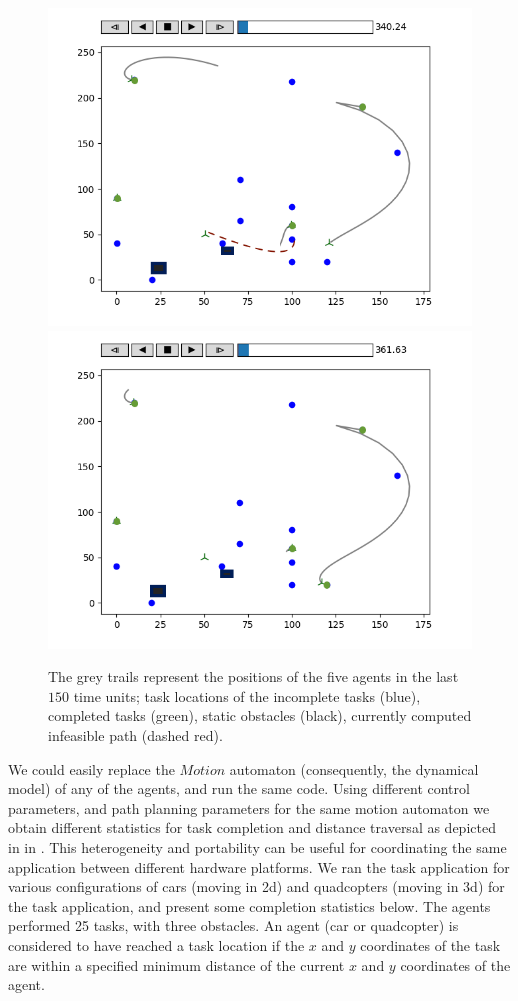 \begin{figure}[h!]
\begin{minipage}{0.5\textwidth}
\includegraphics[width=.5\textwidth]{figs/task2.png}\hfill
\includegraphics[width=.5\textwidth]{figs/task1.png}\hfill%
\end{minipage}%
\caption{\small The grey trails represent the positions of the five agents in the last $150$ time units; task locations of the incomplete tasks (blue), completed tasks (green), static obstacles (black), currently computed infeasible path (dashed red).}
\label{fig:taskplots}
\end{figure}

We could  easily replace the $\mathit{Motion}$ automaton (consequently, the dynamical model) of any of the agents, and run the same code. Using different control parameters, and path planning parameters for the same motion automaton we obtain different statistics for task completion and distance traversal as depicted in in . This heterogeneity and portability can be useful for coordinating the same application between different hardware platforms. We ran the task application for various configurations of cars (moving in 2d) and quadcopters (moving in 3d) for the task application, and present some completion statistics below. The agents performed 25 tasks, with three obstacles. An agent (car or quadcopter) is considered to have reached a task location if the $x$ and $y$ coordinates of the task are within a specified minimum distance of the current $x$ and $y$ coordinates of the agent.

